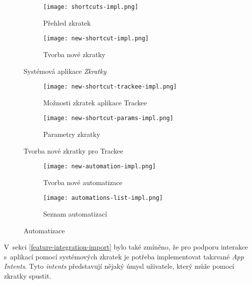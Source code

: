 \begin{figure}[p]
    \centering
    \begin{subfigure}[b]{0.4\textwidth}
		\centering
		\texttt{[image: shortcuts-impl.png]}
		\caption{Přehled zkratek}
		\label{fig:shortcuts-impl}
	\end{subfigure}
	\hspace{2cm}
	\begin{subfigure}[b]{0.4\textwidth}
		\centering
		\texttt{[image: new-shortcut-impl.png]}
		\caption{Tvorba nové zkratky}
		\label{fig:new-shortcut-impl}
	\end{subfigure}
	\caption{Systémová aplikace \emph{Zkratky}}
	\label{fig:system-shortcuts-impl}
\end{figure}

\begin{figure}[p]
    \centering
    \begin{subfigure}[b]{0.4\textwidth}
		\centering
		\texttt{[image: new-shortcut-trackee-impl.png]}
		\caption{Možnosti zkratek aplikace Trackee}
		\label{fig:new-shortcut-trackee-impl}
	\end{subfigure}
	\hspace{2cm}
	\begin{subfigure}[b]{0.4\textwidth}
		\centering
		\texttt{[image: new-shortcut-params-impl.png]}
		\caption{Parametry zkratky}
		\label{fig:new-shortcut-params-impl}
	\end{subfigure}
	\caption{Tvorba nové zkratky pro Trackee}
	\label{fig:new-trackee-shortcut}
\end{figure}

\begin{figure}[p]
    \centering
    \begin{subfigure}[b]{0.4\textwidth}
		\centering
		\texttt{[image: new-automation-impl.png]}
		\caption{Tvorba nové automatizace}
		\label{fig:new-automation-impl}
	\end{subfigure}
	\hspace{2cm}
	\begin{subfigure}[b]{0.4\textwidth}
		\centering
		\texttt{[image: automations-list-impl.png]}
		\caption{Seznam automatizací}
		\label{fig:automations-list-impl}
	\end{subfigure}
	\caption{Automatizace}
	\label{fig:automations-impl}
\end{figure}

V~sekci \ref{feature-integration-import} bylo také zmíněno, že pro podporu interakce s~aplikací pomocí systémových zkratek je potřeba implementovat takzvané \emph{App Intents}. Tyto \emph{intents} představují nějaký úmysl uživatele, který může pomocí zkratky spustit. \cite{ios-app-intents}

